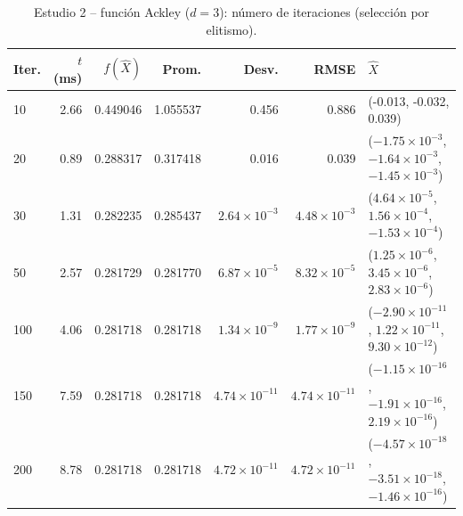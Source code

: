 \begin{table}[!t]
\centering
\scriptsize
\setlength{\tabcolsep}{2.5pt}
\caption{Estudio 2 -- funci\'on Ackley ($d=3$): n\'umero de iteraciones (selecci\'on por elitismo).}
\label{tab:t2a}
\begin{tabular}{lrrrrrl}
\hline
Iter. & $t$ (ms) & $f(\hat{X})$ & Prom. & Desv. & RMSE & $\hat{X}$ \\
\hline
10 & 2.66 & 0.449046 & 1.055537 & 0.456 & 0.886 & (-0.013, -0.032, 0.039) \\
20 & 0.89 & 0.288317 & 0.317418 & 0.016 & 0.039 & ($-1.75{\times}10^{-3}$, $-1.64{\times}10^{-3}$, $-1.45{\times}10^{-3}$) \\
30 & 1.31 & 0.282235 & 0.285437 & $2.64{\times}10^{-3}$ & $4.48{\times}10^{-3}$ & ($4.64{\times}10^{-5}$, $1.56{\times}10^{-4}$, $-1.53{\times}10^{-4}$) \\
50 & 2.57 & 0.281729 & 0.281770 & $6.87{\times}10^{-5}$ & $8.32{\times}10^{-5}$ & ($1.25{\times}10^{-6}$, $3.45{\times}10^{-6}$, $2.83{\times}10^{-6}$) \\
100 & 4.06 & 0.281718 & 0.281718 & $1.34{\times}10^{-9}$ & $1.77{\times}10^{-9}$ & ($-2.90{\times}10^{-11}$, $1.22{\times}10^{-11}$, $9.30{\times}10^{-12}$) \\
150 & 7.59 & 0.281718 & 0.281718 & $4.74{\times}10^{-11}$ & $4.74{\times}10^{-11}$ & ($-1.15{\times}10^{-16}$, $-1.91{\times}10^{-16}$, $2.19{\times}10^{-16}$) \\
200 & 8.78 & 0.281718 & 0.281718 & $4.72{\times}10^{-11}$ & $4.72{\times}10^{-11}$ & ($-4.57{\times}10^{-18}$, $-3.51{\times}10^{-18}$, $-1.46{\times}10^{-16}$) \\
\hline
\end{tabular}
\end{table}
